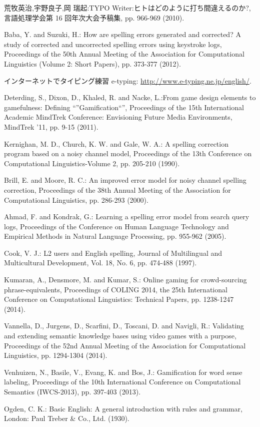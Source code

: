  \begin{thebibliography}{99}
	 荒牧英治,宇野良子,岡 瑞起:TYPO Writer:ヒトはどのように打ち間違えるのか?,言語処理学会第 16 回年次大会予稿集, pp. 966-969 (2010).
	
	 Baba, Y. and Suzuki, H.: How are spelling errors generated and corrected? A study of corrected and uncorrected spelling errors using keystroke logs, Proceedings of the 50th Annual Meeting of the Association for Computational Linguistics (Volume 2: Short Papers), pp. 373-377 (2012).

	 インターネットでタイピング練習 e-typing: \url{http://www.e-typing.ne.jp/english/}.

	 Deterding, S., Dixon, D., Khaled, R. and Nacke, L.:From game design elements to gamefulness: Defining “”Gamification“”, Proceedings of the 15th International Academic MindTrek Conference: Envisioning Future Media Environments, MindTrek ’11, pp. 9-15 (2011).

	 Kernighan, M. D., Church, K. W. and Gale, W. A.: A spelling correction program based on a noisy channel model, Proceedings of the 13th Conference on Computational Linguistics-Volume 2, pp. 205-210 (1990).

	 Brill, E. and Moore, R. C.: An improved error model for noisy channel spelling correction, Proceedings of the 38th Annual Meeting of the Association for Computational Linguistics, pp. 286-293 (2000).

	 Ahmad, F. and Kondrak, G.: Learning a spelling error model from search query logs, Proceedings of the Conference on Human Language Technology and Empirical Methods in Natural Language Processing, pp. 955-962 (2005).

	 Cook, V. J.: L2 users and English spelling, Journal of Multilingual and Multicultural Development, Vol. 18, No. 6, pp. 474-488 (1997).

	 Kumaran, A., Densmore, M. and Kumar, S.: Online gaming for crowd-sourcing phrase-equivalents, Proceedings of COLING 2014, the 25th International Conference on Computational Linguistics: Technical Papers, pp. 1238-1247 (2014).

	 Vannella, D., Jurgens, D., Scarfini, D., Toscani, D. and Navigli, R.: Validating and extending semantic knowledge bases using video games with a purpose, Proceedings of the 52nd Annual Meeting of the Association for Computational Linguistics, pp. 1294-1304 (2014).

	 Venhuizen, N., Basile, V., Evang, K. and Bos, J.: Gamification for word sense labeling, Proceedings of the 10th International Conference on Computational Semantics (IWCS-2013), pp. 397-403 (2013).

	 Ogden, C. K.: Basic English: A general introduction with rules and grammar, London: Paul Treber \& Co., Ltd. (1930).


 \end{thebibliography}


